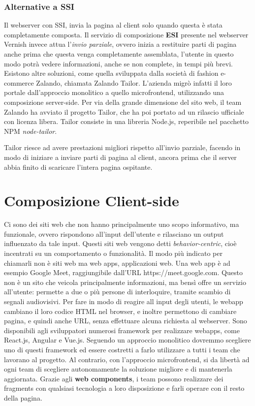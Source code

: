 \subsubsection{Alternative a SSI}
Il webserver con SSI, invia la pagina al client solo quando questa è stata completamente composta.
Il servizio di composizione \textbf{ESI} presente nel webserver Vernish invece attua l'\emph{invio parziale},
 ovvero inizia a restituire parti di pagina anche prima che questa venga completamente assemblata, 
 l'utente in questo modo potrà vedere informazioni, anche se non complete, in tempi più brevi.
\\
Esistono altre soluzioni, come quella sviluppata dalla società di fashion e-commerce Zalando, chiamata Zalando Tailor.
L'azienda migrò infatti il loro portale dall'approccio monolitico a quello microfrontend, utilizzando una composizione
server-side. Per via della grande dimensione del sito web, il team Zalando ha avviato il progetto Tailor, che ha poi portato ad un rilascio 
ufficiale con licenza libera. Tailor consiste in una libreria Node.js, reperibile nel pacchetto NPM \emph{node-tailor}.

Tailor riesce ad avere prestazioni migliori rispetto all'invio parziale, facendo in modo di iniziare a inviare parti di pagina al client,
ancora prima che il server abbia finito di scaricare l'intera pagina ospitante.

\pagebreak
\section{Composizione Client-side}
Ci sono dei siti web che non hanno principalmente uno scopo informativo, ma funzionale, ovvero rispondono all'input dell'utente
e rilasciano un output influenzato da tale input. Questi siti web vengono detti \emph{behavior-centric}, cioè 
incentrati su un comportamento o funzionalità.
Il modo più indicato per chiamarli non è siti web ma web apps, applicazioni web.
Una web app è ad esempio Google Meet, raggiungibile dall'URL https://meet.google.com.
Questo non è un sito che veicola principalmente informazioni, ma bensì offre un servizio all'utente: permette a due o più persone di 
interloquire, tramite scambio di segnali audiovisivi. Per fare in modo di reagire
all input degli utenti, le webapp cambiano il loro codice HTML nel browser, e inoltre permettono 
di cambiare pagina, e quindi anche URL, senza effettuare alcuna richiesta al webserver.
Sono disponibili agli sviluppatori numerosi framework per realizzare webapps, come React.js, Angular e Vue.js.
Seguendo un approccio monolitico dovremmo scegliere uno di questi framework ed essere costretti a farlo utilizzare
a tutti i team che lavorano al progetto. Al contrario, con l'approccio microfrontend, si da libertà ad ogni team
di scegliere autonomamente la soluzione migliore e di mantenerla aggiornata.
Grazie agli \textbf{web components}, i team possono realizzare dei fragments con qualsiasi tecnologia a loro disposizione e 
farli operare con il resto della pagina.



